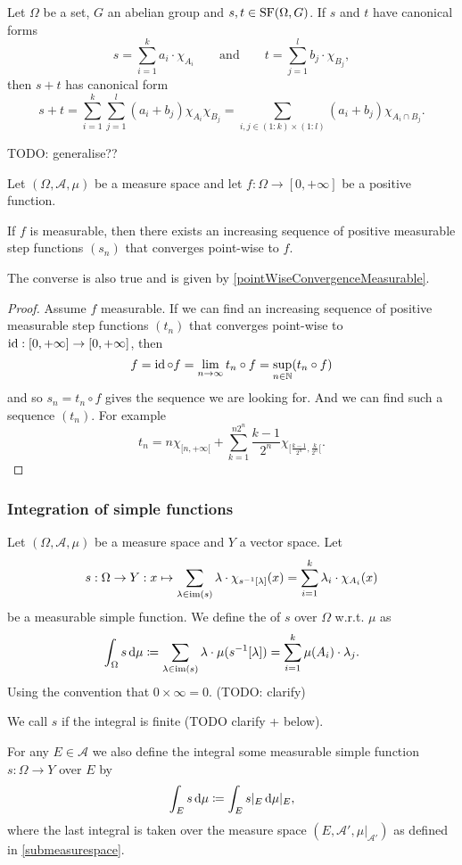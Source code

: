 \begin{lemma}
Let $\Omega$ be a set, $G$ an abelian group and $s,t\in\operatorname{SF}(\Omega,G)$. If $s$ and $t$ have canonical forms
\[ s = \sum_{i=1}^k a_i\cdot\chi_{A_i} \qquad\text{and}\qquad t = \sum_{j=1}^l b_j\cdot\chi_{B_j}, \]
then $s+t$ has canonical form
\[ s+t = \sum_{i=1}^k\sum_{j=1}^l (a_i+b_j)\chi_{A_i}\chi_{B_j} = \sum_{i,j \in (1:k)\times(1:l)}(a_i+b_j)\chi_{A_i\cap B_j}. \]
\end{lemma}


TODO: generalise??
\begin{proposition} \label{measurableFunctionPointwiseLimitSimpleFunctions}
Let $(\Omega, \mathcal{A}, \mu)$ be a measure space and let $f:\Omega\to[0,+\infty]$ be a positive function.

If $f$ is measurable, then there exists an increasing sequence of positive measurable step functions $(s_n)$ that converges point-wise to $f$.
\end{proposition}
The converse is also true and is given by \ref{pointWiseConvergenceMeasurable}.
\begin{proof}
Assume $f$ measurable. If we can find an increasing sequence of positive measurable step functions $(t_n)$ that converges point-wise to $\operatorname{id}:[0,+\infty]\to[0,+\infty]$, then
\[ f = \operatorname{id}\circ f = \lim_{n\to\infty} t_n\circ f = \sup_{n\in\mathbb{N}}(t_n\circ f) \]
and so $s_n = t_n\circ f$ gives the sequence we are looking for. And we can find such a sequence $(t_n)$. For example
\[ t_n = n\chi_{[n,+\infty[}+\sum_{k=1}^{n2^n}\frac{k-1}{2^n}\chi_{[\frac{k-1}{2^n},\frac{k}{2^n}[}. \]
\end{proof}


\subsubsection{Integration of simple functions}
\begin{definition}
Let $(\Omega, \mathcal{A}, \mu)$ be a measure space and $Y$ a vector space. Let
\[ s:\Omega \to Y: x\mapsto \sum_{\lambda \in \operatorname{im}(s)}\lambda\cdot \chi_{s^{-1}[\lambda]}(x) = \sum_{i=1}^k\lambda_i\cdot\chi_{A_i}(x)  \]
be a measurable simple function. We define the  of $s$ over $\Omega$ w.r.t. $\mu$ as
\[ \int_\Omega s\operatorname{d \!}{\mu} \coloneqq \sum_{\lambda \in \operatorname{im}(s)}\lambda\cdot \mu(s^{-1}[\lambda]) = \sum_{i=1}^k\mu(A_i)\cdot\lambda_j. \]
Using the convention that $0\times \infty = 0$. (TODO: clarify)

We call $s$  if the integral is finite (TODO clarify + below).

For any $E\in\mathcal{A}$ we also define the integral some measurable simple function $s:\Omega\to Y$ over $E$ by
\[ \int_E s \operatorname{d \!}{\mu} \coloneqq \int_E s|_E \operatorname{d \!}{\mu|_E}, \]
where the last integral is taken over the measure space $(E,\mathcal{A}',\mu|_{\mathcal{A}'})$ as defined in \ref{submeasurespace}.
\end{definition}

